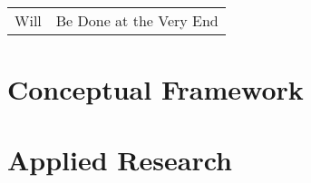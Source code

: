 \documentclass[english,bachelor,unicode,oneside]{ctufit-thesis}
\begin{document}
\printabstractpage


\tableofcontents
\listoffigures %
\begingroup
\let\clearpage\relax
\listoftables %
\thectufitlistingscommand
\endgroup

\chapter{\thectufitabbreviationlabel}

\begin{tabular}{rl}
Will & Be Done at the Very End\\
\end{tabular}

\resumeTOCentries
\mainmatter\mainmatterinit



\part{Conceptual Framework}  %





\part{Applied Research}  %



\appendix\appendixinit


\backmatter

\printbibliography %

\end{document}
